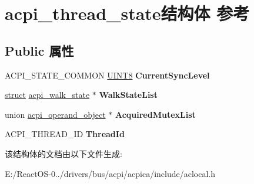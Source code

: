 \hypertarget{structacpi__thread__state}{}\section{acpi\+\_\+thread\+\_\+state结构体 参考}
\label{structacpi__thread__state}
\subsection*{Public 属性}
\begin{DoxyCompactItemize}
\item 
\mbox{\label{structacpi__thread__state_aa3c307cc59f776d84e429c39320dc243}} 
A\+C\+P\+I\+\_\+\+S\+T\+A\+T\+E\+\_\+\+C\+O\+M\+M\+ON \hyperlink{_processor_bind_8h_ab27e9918b538ce9d8ca692479b375b6a}{U\+I\+N\+T8} {\bfseries Current\+Sync\+Level}
\item 
\mbox{\label{structacpi__thread__state_a86bf3bb0cc6b76dbc31f3f1ff07db26b}} 
\hyperlink{interfacestruct}{struct} \hyperlink{structacpi__walk__state}{acpi\+\_\+walk\+\_\+state} $\ast$ {\bfseries Walk\+State\+List}
\item 
\mbox{\label{structacpi__thread__state_ad0209784013e2642cb45ac9cd208d56c}} 
union \hyperlink{unionacpi__operand__object}{acpi\+\_\+operand\+\_\+object} $\ast$ {\bfseries Acquired\+Mutex\+List}
\item 
\mbox{\label{structacpi__thread__state_af32c73377c5db0914019007c80eac419}} 
A\+C\+P\+I\+\_\+\+T\+H\+R\+E\+A\+D\+\_\+\+ID {\bfseries Thread\+Id}
\end{DoxyCompactItemize}


该结构体的文档由以下文件生成\+:\begin{DoxyCompactItemize}
\item 
E\+:/\+React\+O\+S-\/0../drivers/bus/acpi/acpica/include/aclocal.\+h\end{DoxyCompactItemize}
